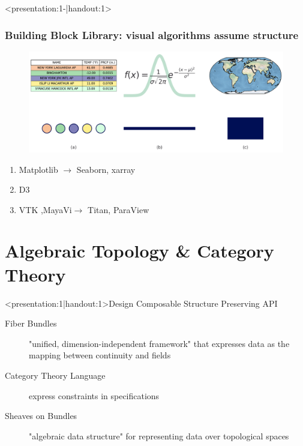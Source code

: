 \documentclass[xcolor={dvipsnames}]{beamer}
\begin{document}
\begin{frame}<presentation:1-|handout:1>
    \frametitle{Building Block Library\cite{wongsuphasawatNavigatingWideWorld2021}: visual algorithms assume structure \cite{toryRethinkingVisualizationHighlevel2004}}
    \begin{figure}
        \includegraphics[height=.3\textheight]{../paper/figures/k_different_types.png}
    \end{figure}

    \begin{enumerate}
        \item Matplotlib\cite{hunterMatplotlib2DGraphics2007} $\rightarrow$ Seaborn\cite{waskom2020seaborn}, xarray \cite{hoyer2017xarray} 
        \item D3 \cite{bostockDataDrivenDocuments2011}
        \item VTK \cite{hanwellVisualizationToolkitVTK2015,geveciVTK2012},MayaVi\cite{RamachandranMayaVI2011}$\rightarrow$ Titan\cite{brianwylieUnifiedToolkitInformation2009}, ParaView\cite{ahrens2005paraview}
    \end{enumerate}
\end{frame}

\section{Algebraic Topology & Category Theory}
\begin{frame}<presentation:1|handout:1>{Design Composable Structure Preserving API}
    \begin{description}
        \item[Fiber Bundles] "unified, dimension-independent framework" that expresses data as the mapping between continuity and fields \cite{butlerVectorBundleClassesForm1992,butlerVisualizationModelBased1989}
        \item[Category Theory Language] express constraints in specifications \cite{wielsManagementEvolvingSpecifications1998}   
        \item[Sheaves on Bundles] "algebraic data structure" for representing data over topological spaces \cite{ghristElementaryAppliedTopology2014}
    \end{description}
\end{frame}
\end{document}
